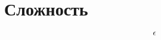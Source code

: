 \documentclass[a4paper, fontsize=13pt, oneside]{scrartcl}
\begin{document}
	\chapter[align = center]{Сложность}
	
	\begin{equation*}
		\epsilon
	\end{equation*}
\end{document}
